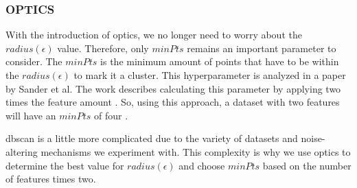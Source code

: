 \subsubsection{OPTICS} \label{theory:clustering-dbscan}
With the introduction of \gls{optics}, we no longer need to worry about the $radius(\epsilon)$ value.
Therefore, only $minPts$ remains an important parameter to consider. \newline
The $minPts$ is the minimum amount of points that have to be within the $radius(\epsilon)$ to mark it a cluster.
This hyperparameter is analyzed in a paper by Sander et al.
The work describes calculating this parameter by applying two times the feature amount \citep{sander_density-based_1998}.
So, using this approach, a dataset with two features will have an $minPts$ of four \citep{schubert_dbscan_2017}.

\gls{dbscan} is a little more complicated due to the variety of datasets and noise-altering mechanisms we experiment with.
This complexity is why we use \gls{optics} to determine the best value for $radius(\epsilon)$ and choose $minPts$ based on the number of features times two.

